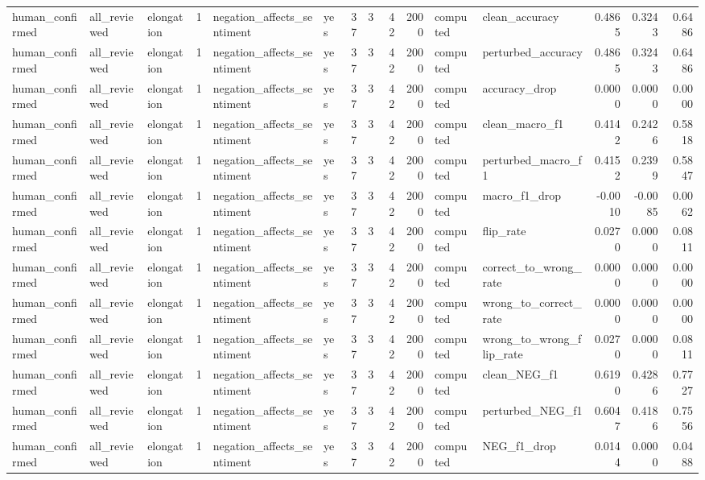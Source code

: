 \begin{tabular}{lllrllrrrrllrrr}
human_confirmed & all_reviewed & elongation & 1 & negation_affects_sentiment & yes & 37 & 3 & 42 & 2000 & computed & clean_accuracy & 0.4865 & 0.3243 & 0.6486 \\
human_confirmed & all_reviewed & elongation & 1 & negation_affects_sentiment & yes & 37 & 3 & 42 & 2000 & computed & perturbed_accuracy & 0.4865 & 0.3243 & 0.6486 \\
human_confirmed & all_reviewed & elongation & 1 & negation_affects_sentiment & yes & 37 & 3 & 42 & 2000 & computed & accuracy_drop & 0.0000 & 0.0000 & 0.0000 \\
human_confirmed & all_reviewed & elongation & 1 & negation_affects_sentiment & yes & 37 & 3 & 42 & 2000 & computed & clean_macro_f1 & 0.4142 & 0.2426 & 0.5818 \\
human_confirmed & all_reviewed & elongation & 1 & negation_affects_sentiment & yes & 37 & 3 & 42 & 2000 & computed & perturbed_macro_f1 & 0.4152 & 0.2399 & 0.5847 \\
human_confirmed & all_reviewed & elongation & 1 & negation_affects_sentiment & yes & 37 & 3 & 42 & 2000 & computed & macro_f1_drop & -0.0010 & -0.0085 & 0.0062 \\
human_confirmed & all_reviewed & elongation & 1 & negation_affects_sentiment & yes & 37 & 3 & 42 & 2000 & computed & flip_rate & 0.0270 & 0.0000 & 0.0811 \\
human_confirmed & all_reviewed & elongation & 1 & negation_affects_sentiment & yes & 37 & 3 & 42 & 2000 & computed & correct_to_wrong_rate & 0.0000 & 0.0000 & 0.0000 \\
human_confirmed & all_reviewed & elongation & 1 & negation_affects_sentiment & yes & 37 & 3 & 42 & 2000 & computed & wrong_to_correct_rate & 0.0000 & 0.0000 & 0.0000 \\
human_confirmed & all_reviewed & elongation & 1 & negation_affects_sentiment & yes & 37 & 3 & 42 & 2000 & computed & wrong_to_wrong_flip_rate & 0.0270 & 0.0000 & 0.0811 \\
human_confirmed & all_reviewed & elongation & 1 & negation_affects_sentiment & yes & 37 & 3 & 42 & 2000 & computed & clean_NEG_f1 & 0.6190 & 0.4286 & 0.7727 \\
human_confirmed & all_reviewed & elongation & 1 & negation_affects_sentiment & yes & 37 & 3 & 42 & 2000 & computed & perturbed_NEG_f1 & 0.6047 & 0.4186 & 0.7556 \\
human_confirmed & all_reviewed & elongation & 1 & negation_affects_sentiment & yes & 37 & 3 & 42 & 2000 & computed & NEG_f1_drop & 0.0144 & 0.0000 & 0.0488 \\

\end{tabular}

